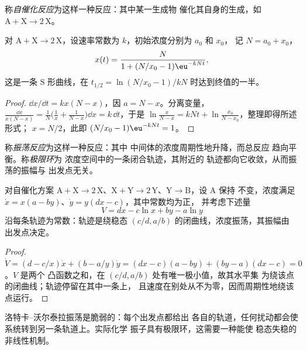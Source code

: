 \begin{definition}[自催化反应]\label{def:b3:complex-kinetics:autocatalysis}
称\emph{自催化反应}为这样一种反应：其中某一生成物
催化其自身的生成，如 $\mathrm{A + X \to 2\,X}$。
\end{definition}

\begin{proposition}[逻辑斯谛定律]\label{prop:b3:complex-kinetics:logistic}
对 $\mathrm{A + X \to 2\,X}$，设速率常数为 $k$，初始浓度分别为 $a_0$ 和 $x_0$，
记 $N = a_0 + x_0$，
\[
  x(t) = \frac{N}{1 + (N/x_0 - 1)\eu^{-kNt}},
\]
这是一条 S 形曲线，在 $t_{1/2} = \ln(N/x_0 - 1)/kN$ 时达到终值的一半。
\end{proposition}

\begin{proof}
$\dd x/\dd t = kx(N - x)$，因 $a = N - x$。分离变量，$\frac{\dd x}{x(N - x)} = \frac1N\bigl(\frac1x + \frac{1}{N - x}\bigr)\dd x
= k\,\dd t$，于是 $\ln\frac{x}{N - x} = kNt + \ln\frac{x_0}{N - x_0}$，整理即得所述形式；
$x = N/2$，此即 $(N/x_0 - 1)\eu^{-kNt} = 1$。
\end{proof}

\begin{definition}\label{def:b3:complex-kinetics:oscillating}
称\emph{振荡反应}为这样一种反应：其中
中间体的浓度周期性地升降，而总反应
趋向平衡。称\emph{极限环}为
浓度空间中的一条闭合轨迹，其附近的
轨迹都向它收敛，从而振荡的振幅与
出发点无关。
\end{definition}

\begin{theorem}\label{thm:b3:complex-kinetics:lotka-volterra}
对自催化方案 $\mathrm{A + X \to 2\,X}$、$\mathrm{X + Y \to 2\,Y}$、$\mathrm{Y \to B}$，设 A 保持
不变，浓度满足 $\dot x = x(a - by)$、$\dot y = y(dx - c)$，其中常数均为正，
并考虑下述量
\[
  V = dx - c\ln x + by - a\ln y
\]
沿每条轨迹为常数：轨迹是绕稳态
$(c/d, a/b)$ 的闭曲线，浓度振荡，其振幅由
出发点决定。
\end{theorem}

\begin{proof}
$\dot V = (d - c/x)\dot x + (b - a/y)\dot y = (dx - c)(a - by) + (by - a)(dx - c) = 0$。$V$ 是两个
凸函数之和，在 $(c/d, a/b)$ 处有唯一极小值，故其水平集
为绕该点的闭曲线；轨迹停留在其中一条上，
且速度在别处从不为零，因而周期性地绕该点运行。
\end{proof}

洛特卡–沃尔泰拉振荡是脆弱的：每个出发点都给出
各自的轨道，任何扰动都会使系统转到另一条轨道上。实际化学
振子具有极限环，这需要一种能使
稳态失稳的非线性机制。

